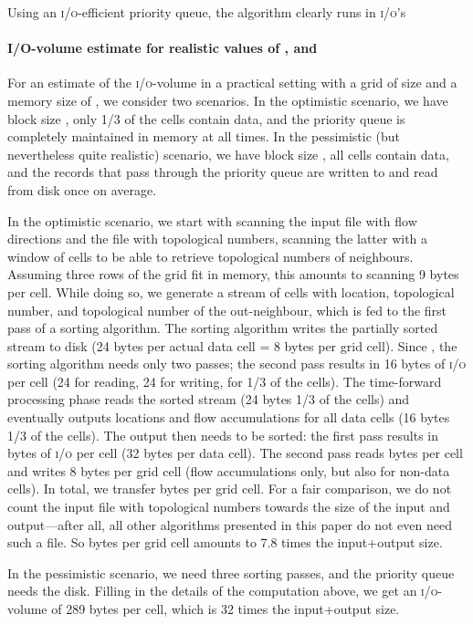 \documentclass[10pt,a4paper]{article}
\def\io{\textsc{i/o}\xspace}
\def\ios{\textsc{i/o}'s\xspace}
\begin{document}
Using an \io-efficient priority queue, the algorithm clearly runs in  \ios~\cite{terraflow,gridproblems}

\paragraph*{I/O-volume estimate for realistic values of ,  and }
For an estimate of the \io-volume in a practical setting with a grid of size  and a memory size of , we consider two scenarios. In the optimistic scenario, we have block size , only 1/3 of the cells contain data, and the priority queue is completely maintained in memory at all times. In the pessimistic (but nevertheless quite realistic) scenario, we have block size , all cells contain data, and the records that pass through the priority queue are written to and read from disk once on average.

In the optimistic scenario, we start with scanning the input file with flow directions and the file with topological numbers, scanning the latter with a window of  cells to be able to retrieve topological numbers of neighbours. Assuming three rows of the grid fit in memory, this amounts to scanning 9 bytes per cell. While doing so, we generate a stream of cells with location, topological number, and topological number of the out-neighbour, which is fed to the first pass of a sorting algorithm. The sorting algorithm writes the partially sorted stream to disk (24 bytes per actual data cell = 8 bytes per grid cell). Since , the sorting algorithm needs only two passes; the second pass results in 16 bytes of \io per cell (24 for reading, 24 for writing, for 1/3 of the cells). The time-forward processing phase reads the sorted stream (24 bytes  1/3 of the cells) and eventually outputs locations and flow accumulations for all data cells (16 bytes  1/3 of the cells). The output then needs to be sorted: the first pass results in  bytes of \io per cell (32 bytes per data cell). The second pass reads  bytes per cell and writes 8 bytes per grid cell (flow accumulations only, but also for non-data cells). In total, we transfer  bytes per grid cell. For a fair comparison, we do not count the input file with topological numbers towards the size of the input and output---after all, all other algorithms presented in this paper do not even need such a file. So  bytes per grid cell amounts to 7.8 times the input+output size.

In the pessimistic scenario, we need three sorting passes, and the priority queue needs the disk. Filling in the details of the computation above, we get an \io-volume of 289 bytes per cell, which is 32 times the input+output size.
\end{document}
